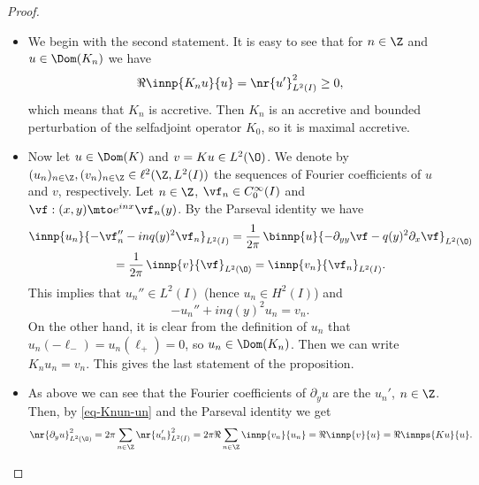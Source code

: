 \skpt
\begin{proof}
\begin{itemize}
\item
We begin with the second statement. It is easy to see that for $n \in \Z$ and $u \in \Dom(K_n)$ we have
\begin{equation} \label{eq-Knun-un}
\Re \innp{K_n u}{u} = \nr{u'}_{L^2(I)}^2 \geq 0,
\end{equation}
which means that $K_n$ is accretive. Then $K_n$ is an accretive and bounded perturbation of the selfadjoint operator $K_0$, so it is maximal accretive.

\item
Now let $u \in \Dom(K)$ and $v = Ku \in L^2(\O)$. We denote by $(u_n)_{n \in \Z}, (v_n)_{n \in \Z} \in \ell^2(\Z,L^2(I))$ the sequences of Fourier coefficients of $u$ and $v$, respectively. Let $n \in \Z$, $\vf_n \in C_0^\infty(I)$ and $\vf : (x,y) \mto e^{inx} \vf_n(y)$. By the Parseval identity we have
\begin{multline*}
\innp{u_n}{-\vf_n'' - in q(y)^2 \vf_n}_{L^2(I)}
= \frac 1 {2\pi}\, \binnp{u}{-\partial_{yy} \vf - q(y)^2 \partial_x \vf}_{L^2(\O)}\\
= \frac 1 {2\pi}\, \innp{v}{\vf}_{L^2(\O)} = \innp{v_n}{\vf_n}_{L^2(I)}.
\end{multline*}
This implies that $u_n'' \in L^2(I)$ (hence $u_n \in H^2(I)$) and
\[
-u_n'' + in q(y)^2 u_n = v_n.
\]
On the other hand, it is clear from the definition of $u_n$ that $u_n(-\ell_-) = u_n(\ell_+) = 0$, so $u_n \in \Dom(K_n)$. Then we can write $K_n u_n = v_n$. This gives the last statement of the proposition.

\item
As above we can see that the Fourier coefficients of $\partial_y u$ are the $u_n'$, $n \in \Z$. Then, by \eqref{eq-Knun-un} and the Parseval identity we get
\begin{equation} \label{eq-K-accretive}
\nr{\partial_y u }_{L^2(\O)}^2 = 2\pi \sum_{n \in \Z} \nr{u_n'}_{L^2(I)}^2 = 2\pi \Re \sum_{n \in \Z} \innp{v_n}{u_n} = \Re \innp{v}{u} = \Re \innps{Ku}{u}.
\end{equation}


\end{itemize}
\end{proof}
